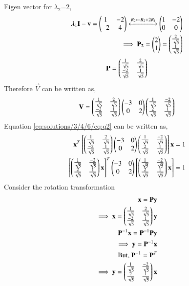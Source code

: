 Eigen vector for $\lambda_2$=2,
\begin{align}
    \lambda_1\mathbf{I}-\mathbf{v}=\begin{pmatrix}1&-2\\-2&4\end{pmatrix}\xleftrightarrow[]{R_2\leftarrow R_2+2R_1}\begin{pmatrix}1&-2\\0&0\end{pmatrix}\\
    \implies \mathbf{P_2}=\begin{pmatrix}2\\1\end{pmatrix}=\begin{pmatrix}\frac{2}{\sqrt{5}}\\\frac{1}{\sqrt{5}}\end{pmatrix}
\end{align}
\begin{align}
    \mathbf{P} = \begin{pmatrix}\frac{1}{\sqrt{5}}&\frac{2}{\sqrt{5}}\\\frac{-2}{\sqrt{5}}&\frac{1}{\sqrt{5}}\end{pmatrix} \label{eq:solutions/3/4/6/eq:eq15}
\end{align}
Therefore $\vec{V}$ can be written as,
\begin{align}
    \mathbf{V}=\begin{pmatrix}\frac{1}{\sqrt{5}}&\frac{2}{\sqrt{5}}\\\frac{-2}{\sqrt{5}}&\frac{1}{\sqrt{5}}\end{pmatrix}\begin{pmatrix}-3&0\\0&2\end{pmatrix}\begin{pmatrix}\frac{1}{\sqrt{5}}&\frac{-2}{\sqrt{5}}\\\frac{2}{\sqrt{5}}&\frac{1}{\sqrt{5}}\end{pmatrix}
\end{align}
Equation \eqref{eq:solutions/3/4/6/eq:q2} can be written as,
\begin{align}
    \mathbf{x}^T\left[\begin{pmatrix}\frac{1}{\sqrt{5}}&\frac{2}{\sqrt{5}}\\\frac{-2}{\sqrt{5}}&\frac{1}{\sqrt{5}}\end{pmatrix}\begin{pmatrix}-3&0\\0&2\end{pmatrix}\begin{pmatrix}\frac{1}{\sqrt{5}}&\frac{-2}{\sqrt{5}}\\\frac{2}{\sqrt{5}}&\frac{1}{\sqrt{5}}\end{pmatrix}\right]\mathbf{x}=1\\
  \left[\begin{pmatrix}\frac{1}{\sqrt{5}}&\frac{-2}{\sqrt{5}}\\\frac{2}{\sqrt{5}}&\frac{1}{\sqrt{5}}\end{pmatrix}\mathbf{x}\right]^T\begin{pmatrix}-3&0\\0&2\end{pmatrix}\left[\begin{pmatrix}\frac{1}{\sqrt{5}}&\frac{-2}{\sqrt{5}}\\\frac{2}{\sqrt{5}}&\frac{1}{\sqrt{5}}\end{pmatrix}\mathbf{x}\right]= 1\label{eq:solutions/3/4/6/eq:eq11}
\end{align}
Consider the rotation transformation 
\begin{align}
  \mathbf{x}=\mathbf{P}\mathbf{y}\\
  \implies \mathbf{x}=\begin{pmatrix}\frac{1}{\sqrt{5}}&\frac{2}{\sqrt{5}}\\\frac{-2}{\sqrt{5}}&\frac{1}{\sqrt{5}}\end{pmatrix}\mathbf{y}\\
  \mathbf{P}^{-1}\mathbf{x}=\mathbf{P}^{-1}\mathbf{P}\mathbf{y}\\
  \implies \mathbf{y}= \mathbf{P}^{-1}\mathbf{x}\\
  \text{But, }\mathbf{P}^{-1}=\mathbf{P}^T\\
  \implies \mathbf{y}=\begin{pmatrix}\frac{1}{\sqrt{5}}&\frac{-2}{\sqrt{5}}\\\frac{2}{\sqrt{5}}&\frac{1}{\sqrt{5}}\end{pmatrix}\mathbf{x} \label{eq:solutions/3/4/6/eq:eq12}
\end{align}
